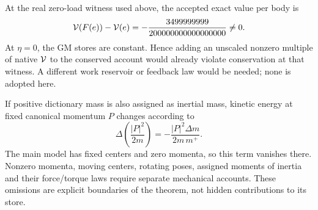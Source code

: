 At the real zero-load witness used above, the accepted exact value per body is
\[
 \mathcal V(F(e))-\mathcal V(e)=-\frac{3499999999}{200000000000000000}\ne0.
\]
At \(\eta=0\), the GM stores are constant. Hence adding an unscaled nonzero multiple of native \(\mathcal V\) to the conserved account would already violate conservation at that witness. A different work reservoir or feedback law would be needed; none is adopted here.

If positive dictionary mass is also assigned as inertial mass, kinetic energy at fixed canonical momentum \(P\) changes according to
\begin{equation}
 \Delta\left(\frac{|P|^2}{2m}\right)
 =-\frac{|P|^2\Delta m}{2m\,m^+}.
 \label{eq:kinetic}
\end{equation}
The main model has fixed centers and zero momenta, so this term vanishes there. Nonzero momenta, moving centers, rotating poses, assigned moments of inertia and their force/torque laws require separate mechanical accounts. These omissions are explicit boundaries of the theorem, not hidden contributions to its store.
